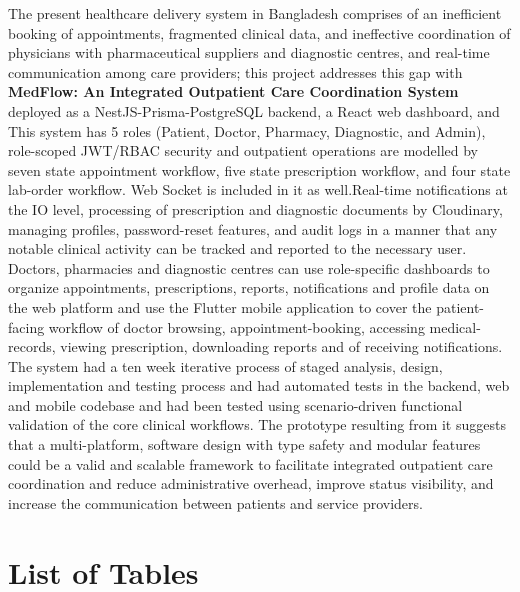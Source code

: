\documentclass[12pt,a4paper]{report}
\begin{document}
The present healthcare delivery system in Bangladesh comprises of an inefficient booking of appointments, fragmented clinical data, and ineffective coordination of physicians with pharmaceutical suppliers and diagnostic centres, and real-time communication among care providers; this project addresses this gap with \textbf{MedFlow: An Integrated Outpatient Care Coordination System} deployed as a NestJS-Prisma-PostgreSQL backend, a React web dashboard, and This system has 5 roles (Patient, Doctor, Pharmacy, Diagnostic, and Admin), role-scoped JWT/RBAC security and outpatient operations are modelled by seven state appointment workflow, five state prescription workflow, and four state lab-order workflow. Web Socket is included in it as well.Real-time notifications at the IO level, processing of prescription and diagnostic documents by Cloudinary, managing profiles, password-reset features, and audit logs in a manner that any notable clinical activity can be tracked and reported to the necessary user. Doctors, pharmacies and diagnostic centres can use role-specific dashboards to organize appointments, prescriptions, reports, notifications and profile data on the web platform and use the Flutter mobile application to cover the patient-facing workflow of doctor browsing, appointment-booking, accessing medical-records, viewing prescription, downloading reports and of receiving notifications. The system had a ten week iterative process of staged analysis, design, implementation and testing process and had automated tests in the backend, web and mobile codebase and had been tested using scenario-driven functional validation of the core clinical workflows. The prototype resulting from it suggests that a multi-platform, software design with type safety and modular features could be a valid and scalable framework to facilitate integrated outpatient care coordination and reduce administrative overhead, improve status visibility, and increase the communication between patients and service providers.

\clearpage

\tableofcontents
\clearpage
{}
\chapter*{List of Tables}
\thispagestyle{plain}
\noindent{}\par
\vspace{6pt}
\begingroup
\makeatletter
{}
\makeatother
\endgroup
\clearpage
{}
\end{document}

